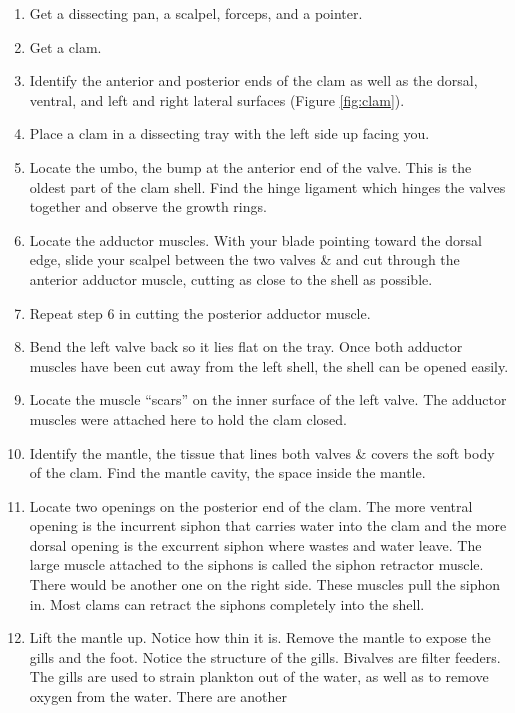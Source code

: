 \documentclass[]{book}
\providecommand{\tightlist}{%
  \setlength{\itemsep}{0pt}\setlength{\parskip}{0pt}}
\theoremstyle{definition}
\theoremstyle{definition}
\theoremstyle{definition}
\theoremstyle{remark}
\begin{document}
\begin{enumerate}
\def\labelenumi{\arabic{enumi}.}
\tightlist
\item
  Get a dissecting pan, a scalpel, forceps, and a pointer.
\item
  Get a clam.
\item
  Identify the anterior and posterior ends of the clam as well as the
  dorsal, ventral, and left and right lateral surfaces (Figure
  \ref{fig:clam}).
\item
  Place a clam in a dissecting tray with the left side up facing you.
\item
  Locate the umbo, the bump at the anterior end of the valve. This is
  the oldest part of the clam shell. Find the hinge ligament which
  hinges the valves together and observe the growth rings.
\item
  Locate the adductor muscles. With your blade pointing toward the
  dorsal edge, slide your scalpel between the two valves \& and cut
  through the anterior adductor muscle, cutting as close to the shell as
  possible.
\item
  Repeat step 6 in cutting the posterior adductor muscle.
\item
  Bend the left valve back so it lies flat on the tray. Once both
  adductor muscles have been cut away from the left shell, the shell can
  be opened easily.
\item
  Locate the muscle ``scars'' on the inner surface of the left valve.
  The adductor muscles were attached here to hold the clam closed.
\item
  Identify the mantle, the tissue that lines both valves \& covers the
  soft body of the clam. Find the mantle cavity, the space inside the
  mantle.
\item
  Locate two openings on the posterior end of the clam. The more ventral
  opening is the incurrent siphon that carries water into the clam and
  the more dorsal opening is the excurrent siphon where wastes and water
  leave. The large muscle attached to the siphons is called the siphon
  retractor muscle. There would be another one on the right side. These
  muscles pull the siphon in. Most clams can retract the siphons
  completely into the shell.
\item
  Lift the mantle up. Notice how thin it is. Remove the mantle to expose
  the gills and the foot. Notice the structure of the gills. Bivalves
  are filter feeders. The gills are used to strain plankton out of the
  water, as well as to remove oxygen from the water. There are another

\end{enumerate}
\end{document}
